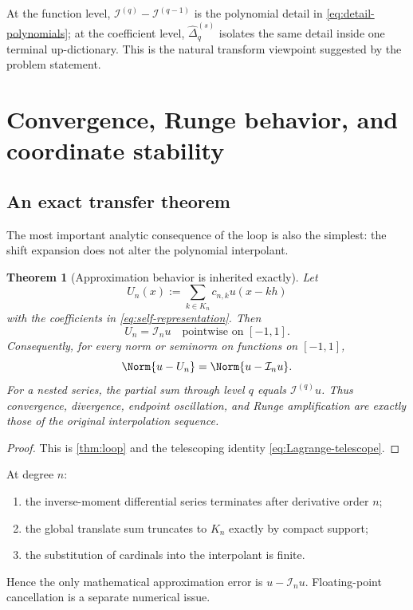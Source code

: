 \documentclass[11pt,oneside]{article}
\numberwithin{equation}{section}
\newtheorem{theorem}{Theorem}[section]
\theoremstyle{definition}
\theoremstyle{remark}
\newcommand{\Lag}{\mathcal I}
\begin{document}
At the function level, $\Lag^{(q)}-\Lag^{(q-1)}$ is the polynomial detail in
\eqref{eq:detail-polynomials}; at the coefficient level,
$\widehat\Delta_q^{(s)}$ isolates the same detail inside one terminal
up-dictionary.  This is the natural transform viewpoint suggested by the
problem statement.

\section{Convergence, Runge behavior, and coordinate stability}
\label{sec:stability}

\subsection{An exact transfer theorem}

The most important analytic consequence of the loop is also the simplest:
the shift expansion does not alter the polynomial interpolant.

\begin{theorem}[Approximation behavior is inherited exactly]
\label{thm:error-transfer}
Let
\begin{equation}
 U_n(x):=\sum_{k\in K_n}c_{n,k}u(x-kh)
 \label{eq:Un-def}
\end{equation}
with the coefficients in \eqref{eq:self-representation}.  Then
\begin{equation}
 U_n=\Lag_nu
 \quad\text{pointwise on }[-1,1].
 \label{eq:Un-equals-I}
\end{equation}
Consequently, for every norm or seminorm on functions on $[-1,1]$,
\begin{equation}
 \Norm{u-U_n}=\Norm{u-\Lag_nu}.
 \label{eq:norm-error-equality}
\end{equation}
For a nested series, the partial sum through level $q$ equals
$\Lag^{(q)}u$.  Thus convergence, divergence, endpoint oscillation, and
Runge amplification are exactly those of the original interpolation
sequence.
\end{theorem}

\begin{proof}
This is \cref{thm:loop} and the telescoping identity
\eqref{eq:Lagrange-telescope}.
\end{proof}

\begin{corollary}
\label{cor:no-truncation-error}
At degree $n$:
\begin{enumerate}
\item the inverse-moment differential series terminates after derivative
order $n$;
\item the global translate sum truncates to $K_n$ exactly by compact support;
\item the substitution of cardinals into the interpolant is finite.
\end{enumerate}
Hence the only mathematical approximation error is
$u-\Lag_nu$.  Floating-point cancellation is a separate numerical issue.
\end{corollary}
\end{document}
